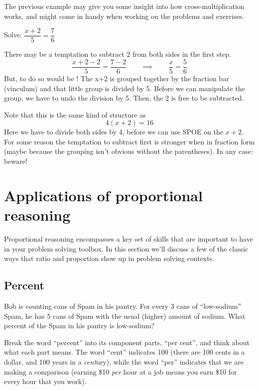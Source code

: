 The previous example may give you some insight into how cross-multiplication works, and might come in handy when working on the problems and exercises.

\begin{boxedwarning}
Solve: $\dfrac{x+2}{5} = \dfrac{7}{6}$

There may be a temptation to subtract 2 from both sides in the first step. \[\dfrac{x+2-2}{5} = \frac{7-2}{6} \qquad\implies\qquad \dfrac{x}{5} = \frac{5}{6}\]
But, to do so would be \evilandwrong! The x+2 is grouped together by the fraction bar (vinculum) and that little group is divided by 5. Before we can manipulate the group, we have to undo the division by 5. Then, the 2 is free to be subtracted.

Note that this is the same kind of structure as \[ 4(x+2) = 16\] Here we have to divide both sides by 4, before we can use SPOE on the $x+2$. For some reason the temptation to subtract first is stronger when in fraction form (maybe because the grouping isn't obvious without the parentheses). In any case: beware!
\end{boxedwarning}

\section{Applications of proportional reasoning}
\label{sec:probsolvwithprops}

Proportional reasoning encompasses a key set of skills that are important to have in your problem solving toolbox. In this section we'll discuss a few of the classic ways that ratio and proportion show up in problem solving contexts.

\subsection{Percent}

\begin{boxedexplore}
Bob is counting cans of Spam in his pantry. For every 3 cans of ``low-sodium'' Spam, he has 5 cans of Spam with the usual (higher) amount of sodium. What percent of the Spam in his pantry is low-sodium? 
\end{boxedexplore}

Break the word ``percent'' into its component parts, ``per cent'', and think about what each part means. The word ``cent'' indicates 100 (there are 100 {\em} cents in a dollar, and 100 years in a \textit{cent}ury), while the word ``per'' indicates that we are making a comparison (earning \$10 \textit{per} hour at a job means you earn \$10 for every hour that you work).

